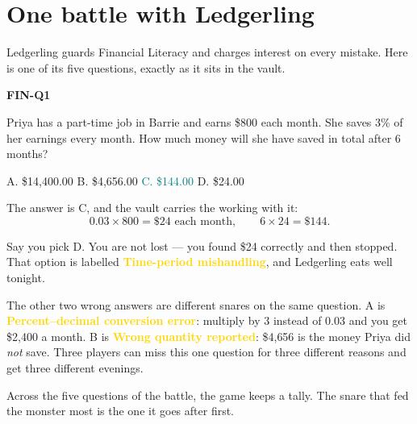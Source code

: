 \documentclass[11pt]{article}
\newcommand{\snare}[1]{\textcolor{Gold}{\textbf{#1}}}
\begin{document}
\section{One battle with Ledgerling}

Ledgerling guards Financial Literacy and charges interest on every mistake.
Here is one of its five questions, exactly as it sits in the vault.

\begin{snarebox}
\textbf{FIN-Q1} 

\medskip
Priya has a part-time job in Barrie and earns \$800 each month. She saves 3\%
of her earnings every month. How much money will she have saved in total after
6 months?

\medskip
{\centering A. \$14,400.00 \quad B. \$4,656.00 \quad
\textcolor{Teal}{C. \$144.00} \quad D. \$24.00\par}
\end{snarebox}

The answer is C, and the vault carries the working with it:
\[
  0.03 \times 800 = \$24 \text{ each month},\qquad 6 \times 24 = \$144 .
\]

Say you pick D. You are not lost --- you found \$24 correctly and then stopped.
That option is labelled \snare{Time-period mishandling}, and Ledgerling eats
well tonight.

The other two wrong answers are different snares on the same question. A is
\snare{Percent--decimal conversion error}: multiply by 3 instead of 0.03 and
you get \$2{,}400 a month. B is \snare{Wrong quantity reported}: \$4{,}656 is
the money Priya did \emph{not} save. Three players can miss this one question
for three different reasons and get three different evenings.

Across the five questions of the battle, the game keeps a tally. The snare that
fed the monster most is the one it goes after first.
\end{document}
